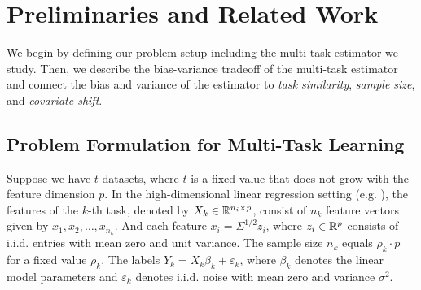 \section{Preliminaries and Related Work}
\label{sec_prelim}

We begin by defining our problem setup including the multi-task estimator we study.
Then, we describe the bias-variance tradeoff of the multi-task estimator and connect the bias and variance of the estimator to \textit{task similarity}, \textit{sample size}, and \textit{covariate shift}.

\subsection{Problem Formulation for Multi-Task Learning}

Suppose we have $t$ datasets, where $t$ is a fixed value that does not grow with the feature dimension $p$.
In the high-dimensional linear regression setting (e.g. \cite{HMRT19,BLLT20}), the features of the $k$-th task, denoted by $X_k\in\mathbb{R}^{n_i\times p}$, consist of $n_k$ feature vectors given by $x_1, x_2, \dots, x_{n_k}$.
And each feature $x_i = \Sigma^{1/2}z_i$, where $z_i\in\mathbb{R}^p$ consists of i.i.d. entries with mean zero and unit variance.
The sample size $n_k $ equals $\rho_k\cdot p$ for a fixed value $\rho_k$.
The labels $Y_k = X_k \beta_k + \varepsilon_k$, where $\beta_k$ denotes the linear model parameters and $\varepsilon_k$ denotes i.i.d. noise with mean zero and variance $\sigma^2$.

